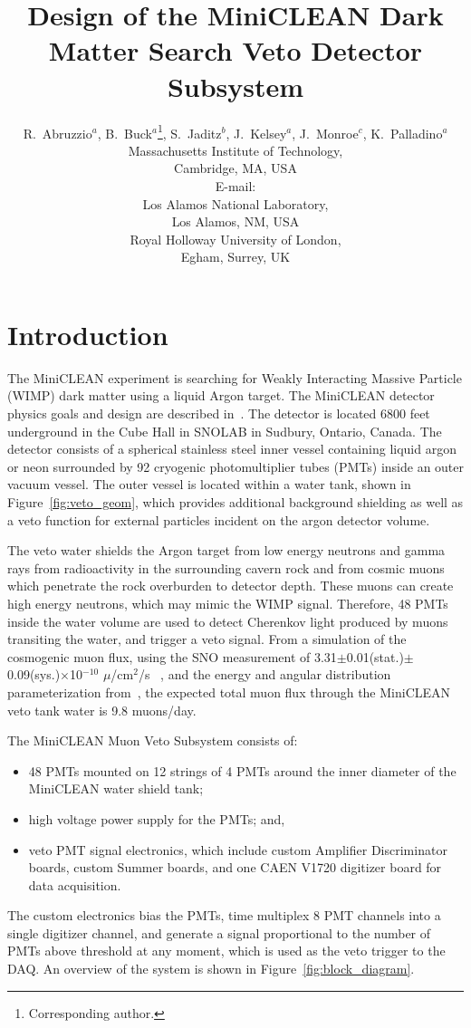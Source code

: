 \documentclass{JINST}
\title{Design of the MiniCLEAN Dark Matter Search Veto Detector Subsystem}
\author{R.~Abruzzio$^a$, B.~Buck$^a$\thanks{Corresponding author.}, S.~Jaditz$^b$, J.~Kelsey$^a$, J.~Monroe$^c$, K.~Palladino$^a$\\
\llap{$^a$}Massachusetts Institute of Technology,\\
	Cambridge, MA, USA\\
	E-mail: \email{bbuck@mit.edu}\\
\llap{$^b$}Los Alamos National Laboratory,\\
	Los Alamos, NM, USA\\
\llap{$^c$}Royal Holloway University of London,\\
	Egham, Surrey, UK}
\begin{document}
\section{Introduction}
\label{Introduction}
The MiniCLEAN experiment is searching for Weakly Interacting Massive Particle (WIMP) dark matter using a liquid Argon target.  The MiniCLEAN detector physics goals and design are described in~\cite{ref:miniclean_physics}.  The detector is located 6800 feet underground in the Cube Hall in SNOLAB in Sudbury, Ontario, Canada.  The detector consists of a spherical stainless steel inner vessel containing liquid argon or neon surrounded by 92 cryogenic photomultiplier tubes (PMTs) inside an outer vacuum vessel. The outer vessel is located within a water tank, shown in Figure~\ref{fig:veto_geom}, which provides additional background shielding as well as a veto function for external particles incident on the argon detector volume.  

The veto water shields the Argon target from low energy neutrons and gamma rays from radioactivity in the surrounding cavern rock and from cosmic muons which penetrate the rock overburden to detector depth.  These muons can create high energy neutrons, which may mimic the WIMP signal.  Therefore, 48 PMTs inside the water volume are used to detect Cherenkov light produced by muons transiting the water, and trigger a veto signal.  From a simulation of the cosmogenic muon flux, using the SNO measurement of 3.31$\pm$0.01(stat.)$\pm$0.09(sys.)$\times$10$^{-10}$ $\mu$/cm$^2$/s ~\cite{ref:sno_muon_flux}, and the energy and angular distribution parameterization from~\cite{ref:mei_and_hime}, the expected total muon flux through the MiniCLEAN veto tank water is 9.8 muons/day.  

The MiniCLEAN Muon Veto Subsystem consists of:
\begin{itemize}
\item 48 PMTs mounted on 12 strings of 4 PMTs around the inner diameter of the MiniCLEAN water shield tank;
\item high voltage power supply for the PMTs; and,
\item veto PMT signal electronics, which include custom Amplifier Discriminator boards, custom Summer boards, and one CAEN V1720 digitizer board for data acquisition.  
\end{itemize}
The custom electronics bias the PMTs, time multiplex 8 PMT channels into a single digitizer channel, and generate a signal proportional to the number of PMTs above threshold at any moment, which is used as the veto trigger to the DAQ.  An overview of the system is shown in Figure~\ref{fig:block_diagram}.
\end{document}
